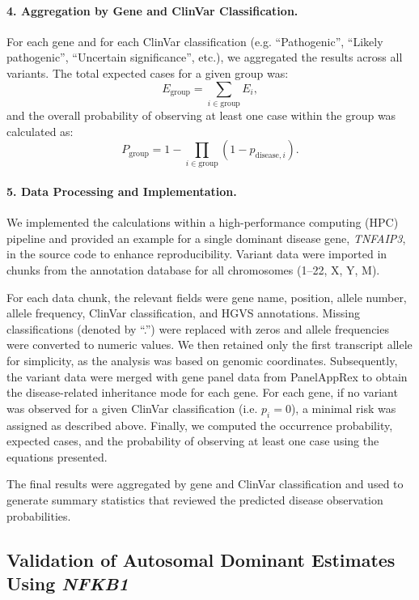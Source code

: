 \paragraph{4. Aggregation by Gene and ClinVar Classification.}
For each gene and for each ClinVar classification (e.g. “Pathogenic”, “Likely pathogenic”, “Uncertain significance”, etc.), we aggregated the results across all variants. The total expected cases for a given group was:
\[
E_{\text{group}} = \sum_{i \in \text{group}} E_i,
\]
and the overall probability of observing at least one case within the group was calculated as:
\[
P_{\text{group}} = 1 - \prod_{i \in \text{group}} \left(1 - p_{\text{disease},i}\right).
\]

\paragraph{5. Data Processing and Implementation.}
We implemented the calculations within a high-performance computing (HPC) pipeline and provided an example for a single dominant disease gene, \textit{TNFAIP3}, in the source code to enhance reproducibility. Variant data were imported in chunks from the annotation database for all chromosomes (1--22, X, Y, M). 

For each data chunk, the relevant fields were gene name, position, allele number, allele frequency, ClinVar classification, and HGVS annotations. Missing classifications (denoted by ``.'') were replaced with zeros and allele frequencies were converted to numeric values. We then retained only the first transcript allele for simplicity, as the analysis was based on genomic coordinates. Subsequently, the variant data were merged with gene panel data from PanelAppRex to obtain the disease-related inheritance mode for each gene. For each gene, if no variant was observed for a given ClinVar classification (i.e. \(p_i = 0\)), a minimal risk was assigned as described above. Finally, we computed the occurrence probability, expected cases, and the probability of observing at least one case using the equations presented.

The final results were aggregated by gene and ClinVar classification and used to generate summary statistics that reviewed the predicted disease observation probabilities.

\subsection{Validation of Autosomal Dominant Estimates Using \textit{NFKB1}}

